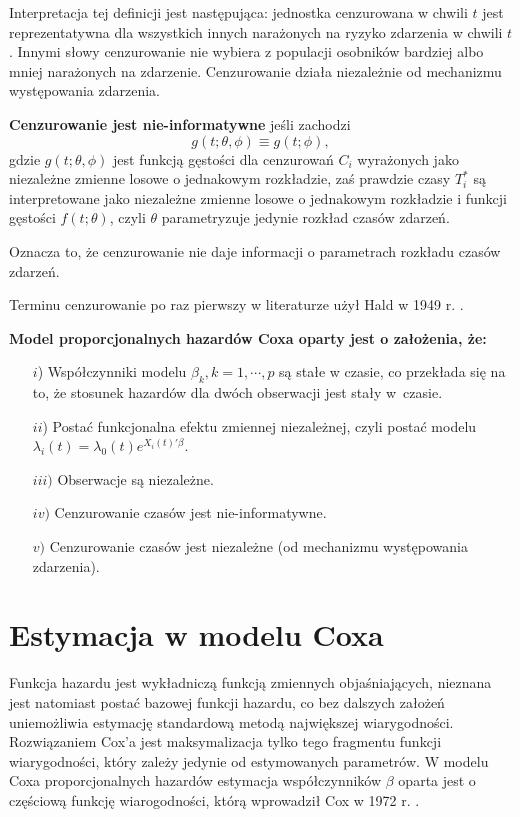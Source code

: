 Interpretacja tej definicji jest następująca: jednostka cenzurowana w chwili $t$ jest reprezentatywna dla wszystkich innych narażonych na ryzyko zdarzenia w chwili $t$. Innymi słowy cenzurowanie nie wybiera z populacji osobników bardziej albo mniej narażonych na zdarzenie. Cenzurowanie działa niezależnie od mechanizmu występowania zdarzenia.

\begin{definition}
\textbf{Cenzurowanie jest nie-informatywne} jeśli zachodzi
\begin{equation}\label{nieinf}
g(t;\theta, \phi) \equiv g(t;\phi),
\end{equation}
gdzie $g(t;\theta, \phi)$ jest funkcją gęstości dla cenzurowań $C_i$ wyrażonych jako niezależne zmienne losowe o jednakowym rozkładzie, zaś prawdzie czasy $T^*_i$ są interpretowane jako niezależne zmienne losowe o jednakowym rozkładzie i funkcji gęstości $f(t;\theta)$, czyli $\theta$ parametryzuje jedynie rozkład czasów zdarzeń.
\end{definition}

Oznacza to, że cenzurowanie nie daje informacji o parametrach rozkładu czasów zdarzeń.

Terminu cenzurowanie po raz pierwszy w literaturze użył Hald w 1949 r. \cite{hald}.

\textbf{Model proporcjonalnych hazardów Coxa oparty jest o założenia, że:}
\begin{enumerate}
\item[$i$)] Współczynniki modelu $\beta_k, k = 1,\cdots,p$ są stałe w czasie, co przekłada się na to, że stosunek hazardów dla dwóch obserwacji jest stały w~czasie.
\item[$ii$)] Postać funkcjonalna efektu zmiennej niezależnej, czyli postać modelu $\lambda_i(t) = \lambda_0(t)e^{X_i(t)'\beta}$.
\item[$iii)$] Obserwacje są niezależne.
\item[$iv)$] Cenzurowanie czasów jest nie-informatywne.
\item[$v)$] Cenzurowanie czasów jest niezależne (od mechanizmu występowania zdarzenia).
\end{enumerate}

\section{Estymacja w modelu Coxa}

Funkcja hazardu jest wykładniczą funkcją zmiennych objaśniających, nieznana jest natomiast
postać bazowej funkcji hazardu, co bez dalszych założeń uniemożliwia estymację standardową
metodą największej wiarygodności. Rozwiązaniem Cox’a jest maksymalizacja tylko tego fragmentu funkcji wiarygodności, który zależy jedynie od estymowanych parametrów. W modelu Coxa proporcjonalnych hazardów estymacja współczynników $\beta$ oparta jest o częściową funkcję wiarogodności, którą wprowadził Cox w 1972 r. \cite{cox}. 

